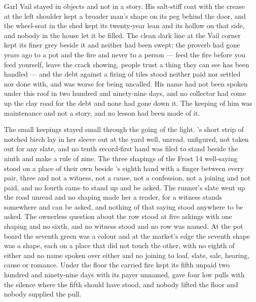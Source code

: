 Garl Vail stayed in objects and not in a story. His salt-stiff coat with the crease at the left shoulder kept a broader man's shape on its peg behind the door, and the wheel-seat in the shed kept its twenty-year lean and its hollow on that side, and nobody in the house let it be filled. The clean dark line at the Vail corner kept its finer grey beside it and neither had been swept; the proverb had gone years ago to a pot and the fire and never to a person --- feed the fire before you feed yourself, leave the crack showing, people trust a thing they can see has been handled --- and the debt against a firing of tiles stood neither paid nor settled nor done with, and was worse for being uncalled. His name had not been spoken under this roof in two hundred and ninety-nine days, and no collector had come up the clay road for the debt and none had gone down it. The keeping of him was maintenance and not a story, and no lesson had been made of it.

\scenebreak

The small keepings stayed small through the going of the light. 's short strip of notched birch lay in her sleeve out at the yard well, unread, unfigured, not taken out for any slate, and no tenth record-first hand was filed to stand beside the ninth and make a rule of nine. The three shapings of the Frost 14 well-saying stood on a place of their own beside 's eighth hand with a finger between every pair, three and not a witness, not a cause, not a confession, not a joining and not paid, and no fourth came to stand up and be asked. The runner's slate went up the road unread and no shaping made her a reader, for a witness stands somewhere and can be asked, and nothing of that saying stood anywhere to be asked. The ownerless question about the row stood at five askings with one shaping and no sixth, and no witness stood and no row was named. At the pot board the seventh green was a colour and at the market's edge the seventh shape was a shape, each on a place that did not touch the other, with no eighth of either and no name spoken over either and no joining to loaf, slate, sale, hearing, cause or romance. Under the floor the carried fire kept its fifth unpaid two hundred and ninety-nine days with its payer unnamed, gave four low pulls with the silence where the fifth should have stood, and nobody lifted the floor and nobody supplied the pull.

